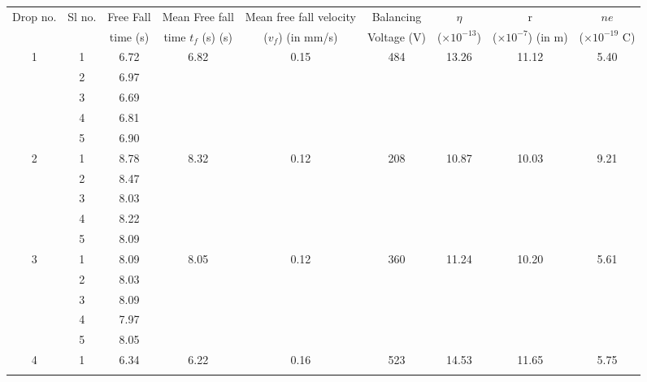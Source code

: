 \begin{table*}[]
    \centering
    \begin{tabular}{|c|c|c|c|c|c|c|c|c|}
    \hline
    Drop no. & Sl no. & Free Fall& Mean Free fall  & Mean free fall velocity & Balancing & $\eta$  & r & $ne$ \\
     & & time (s) & time $t_f$ (s) (s) & ($v_f$) (in mm/s) & Voltage (V) & ($\times   10^{-13}$) & ($\times   10^{-7}$) (in m) & ($\times   10^{-19}$ C) \\ \hline
     \multirow{5}{*}{1} & 1 & 6.72 & \multirow{5}{*}{6.82} & \multirow{5}{*}{0.15} & \multirow{5}{*}{484} & \multirow{5}{*}{13.26} & \multirow{5}{*}{11.12} & \multirow{5}{*}{5.40} \\ \cline{2-3}
     & 2 & 6.97 &  &  &  &  &  &  \\ \cline{2-3}
     & 3 & 6.69 &  &  &  &  &  &  \\ \cline{2-3}
     & 4 & 6.81 &  &  &  &  &  &  \\ \cline{2-3}
     & 5 & 6.90 &  &  &  &  &  &  \\ \hline
    \multirow{5}{*}{2} & 1 & 8.78 & \multirow{5}{*}{8.32} & \multirow{5}{*}{0.12} & \multirow{5}{*}{208} & \multirow{5}{*}{10.87} & \multirow{5}{*}{10.03} & \multirow{5}{*}{9.21} \\ \cline{2-3}
     & 2 & 8.47 &  &  &  &  &  &  \\ \cline{2-3}
     & 3 & 8.03 &  &  &  &  &  &  \\ \cline{2-3}
     & 4 & 8.22 &  &  &  &  &  &  \\ \cline{2-3}
     & 5 & 8.09 &  &  &  &  &  &  \\ \hline
    \multirow{5}{*}{3} & 1 & 8.09 & \multirow{5}{*}{8.05} & \multirow{5}{*}{0.12} & \multirow{5}{*}{360} & \multirow{5}{*}{11.24} & \multirow{5}{*}{10.20} & \multirow{5}{*}{5.61} \\ \cline{2-3}
     & 2 & 8.03 &  &  &  &  &  &  \\ \cline{2-3}
     & 3 & 8.09 &  &  &  &  &  &  \\ \cline{2-3}
     & 4 & 7.97 &  &  &  &  &  &  \\ \cline{2-3}
     & 5 & 8.05 &  &  &  &  &  &  \\ \hline
    \multirow{5}{*}{4} & 1 & 6.34 & \multirow{5}{*}{6.22} & \multirow{5}{*}{0.16} & \multirow{5}{*}{523} & \multirow{5}{*}{14.53} & \multirow{5}{*}{11.65} & \multirow{5}{*}{5.75} \\ \cline{2-3}

\end{tabular}
\end{table*}
